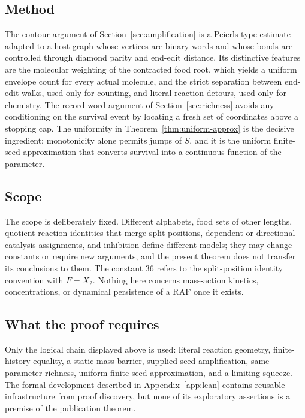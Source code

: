 \documentclass[11pt,reqno]{amsart}
\theoremstyle{plain}
\theoremstyle{definition}
\theoremstyle{remark}
\numberwithin{equation}{section}
\begin{document}
\subsection*{Method}
The contour argument of Section~\ref{sec:amplification} is a Peierls-type estimate \cite{peierls1936ising,grimmett1999percolation} adapted to a host graph whose vertices are binary words and whose bonds are controlled through diamond parity and end-edit distance. Its distinctive features are the molecular weighting of the contracted food root, which yields a uniform envelope count for every actual molecule, and the strict separation between end-edit walks, used only for counting, and literal reaction detours, used only for chemistry. The record-word argument of Section~\ref{sec:richness} avoids any conditioning on the survival event by locating a fresh set of coordinates above a stopping cap. The uniformity in Theorem~\ref{thm:uniform-approx} is the decisive ingredient: monotonicity alone permits jumps of $S$, and it is the uniform finite-seed approximation that converts survival into a continuous function of the parameter.

\subsection*{Scope}
The scope is deliberately fixed. Different alphabets, food sets of other lengths, quotient reaction identities that merge split positions, dependent or directional catalysis assignments, and inhibition define different models; they may change constants or require new arguments, and the present theorem does not transfer its conclusions to them. The constant $36$ refers to the split-position identity convention with $F=X_2$. Nothing here concerns mass-action kinetics, concentrations, or dynamical persistence of a RAF once it exists.

\subsection*{What the proof requires}
Only the logical chain displayed above is used: literal reaction geometry, finite-history equality, a static mass barrier, supplied-seed amplification, same-parameter richness, uniform finite-seed approximation, and a limiting squeeze. The formal development described in Appendix~\ref{app:lean} contains reusable infrastructure from proof discovery, but none of its exploratory assertions is a premise of the publication theorem.

\appendix
\end{document}
